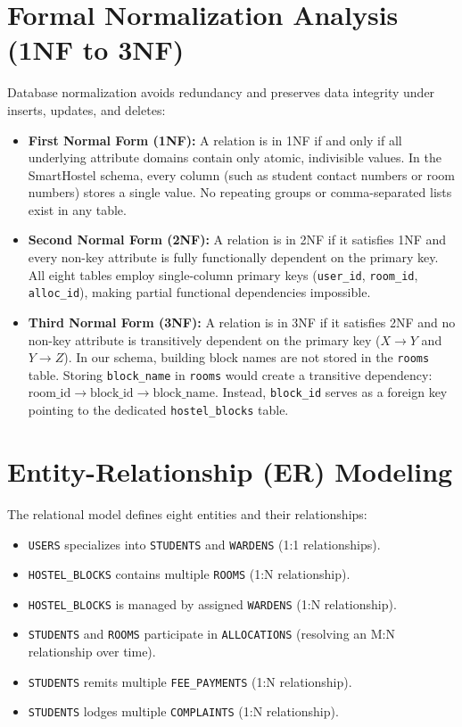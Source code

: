 \documentclass[12pt,a4paper]{report}
\begin{document}
\section{Formal Normalization Analysis (1NF to 3NF)}
Database normalization avoids redundancy and preserves data integrity under inserts, updates, and deletes:
\begin{itemize}
\item \textbf{First Normal Form (1NF):} A relation is in 1NF if and only if all underlying attribute domains contain only atomic, indivisible values. In the SmartHostel schema, every column (such as student contact numbers or room numbers) stores a single value. No repeating groups or comma-separated lists exist in any table.
\item \textbf{Second Normal Form (2NF):} A relation is in 2NF if it satisfies 1NF and every non-key attribute is fully functionally dependent on the primary key. All eight tables employ single-column primary keys (\texttt{user\_id}, \texttt{room\_id}, \texttt{alloc\_id}), making partial functional dependencies impossible.
\item \textbf{Third Normal Form (3NF):} A relation is in 3NF if it satisfies 2NF and no non-key attribute is transitively dependent on the primary key ($X \to Y$ and $Y \to Z$). In our schema, building block names are not stored in the \texttt{rooms} table. Storing \texttt{block\_name} in \texttt{rooms} would create a transitive dependency: $\text{room\_id} \to \text{block\_id} \to \text{block\_name}$. Instead, \texttt{block\_id} serves as a foreign key pointing to the dedicated \texttt{hostel\_blocks} table.
\end{itemize}

\section{Entity-Relationship (ER) Modeling}
The relational model defines eight entities and their relationships:
\begin{itemize}
\item \texttt{USERS} specializes into \texttt{STUDENTS} and \texttt{WARDENS} (1:1 relationships).
\item \texttt{HOSTEL\_BLOCKS} contains multiple \texttt{ROOMS} (1:N relationship).
\item \texttt{HOSTEL\_BLOCKS} is managed by assigned \texttt{WARDENS} (1:N relationship).
\item \texttt{STUDENTS} and \texttt{ROOMS} participate in \texttt{ALLOCATIONS} (resolving an M:N relationship over time).
\item \texttt{STUDENTS} remits multiple \texttt{FEE\_PAYMENTS} (1:N relationship).
\item \texttt{STUDENTS} lodges multiple \texttt{COMPLAINTS} (1:N relationship).
\end{itemize}
\end{document}
